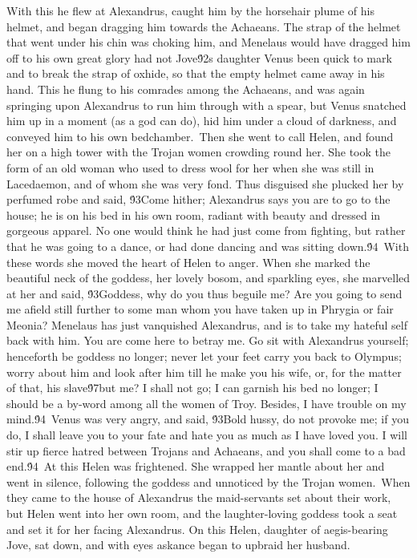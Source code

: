 {With this he flew at Alexandrus, caught him by the horsehair plume of his helmet, and began dragging him towards the Achaeans. The strap of the helmet that went under his chin was choking him, and Menelaus would have dragged him off to his own great glory had not Jove\'92s daughter Venus been quick to mark and to break the strap of oxhide, so that the empty helmet came away in his hand. This he flung to his comrades among the Achaeans, and was again springing upon Alexandrus to run him through with a spear, but Venus snatched him up in a moment (as a god can do), hid him under a cloud of darkness, and conveyed him to his own bedchamber.\
Then she went to call Helen, and found her on a high tower with the Trojan women crowding round her. She took the form of an old woman who used to dress wool for her when she was still in Lacedaemon, and of whom she was very fond. Thus disguised she plucked her by perfumed robe and said, \'93Come hither; Alexandrus says you are to go to the house; he is on his bed in his own room, radiant with beauty and dressed in gorgeous apparel. No one would think he had just come from fighting, but rather that he was going to a dance, or had done dancing and was sitting down.\'94\
With these words she moved the heart of Helen to anger. When she marked the beautiful neck of the goddess, her lovely bosom, and sparkling eyes, she marvelled at her and said, \'93Goddess, why do you thus beguile me? Are you going to send me afield still further to some man whom you have taken up in Phrygia or fair Meonia? Menelaus has just vanquished Alexandrus, and is to take my hateful self back with him. You are come here to betray me. Go sit with Alexandrus yourself; henceforth be goddess no longer; never let your feet carry you back to Olympus; worry about him and look after him till he make you his wife, or, for the matter of that, his slave\'97but me? I shall not go; I can garnish his bed no longer; I should be a by-word among all the women of Troy. Besides, I have trouble on my mind.\'94\
Venus was very angry, and said, \'93Bold hussy, do not provoke me; if you do, I shall leave you to your fate and hate you as much as I have loved you. I will stir up fierce hatred between Trojans and Achaeans, and you shall come to a bad end.\'94\
At this Helen was frightened. She wrapped her mantle about her and went in silence, following the goddess and unnoticed by the Trojan women.\
When they came to the house of Alexandrus the maid-servants set about their work, but Helen went into her own room, and the laughter-loving goddess took a seat and set it for her facing Alexandrus. On this Helen, daughter of aegis-bearing Jove, sat down, and with eyes askance began to upbraid her husband.\
}
